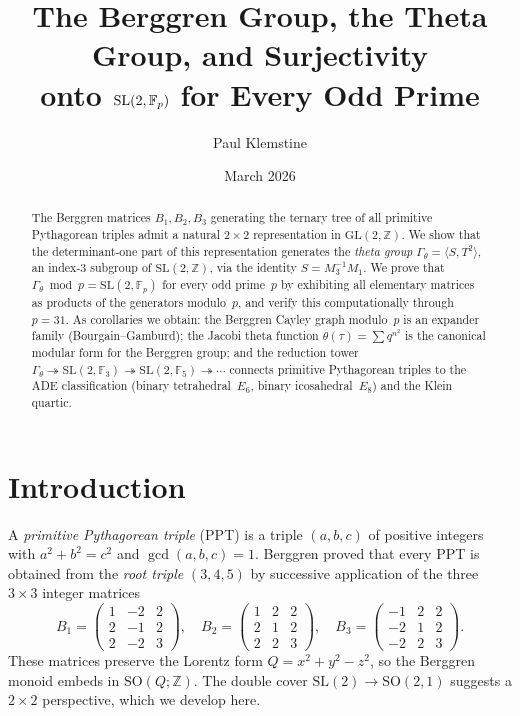 \documentclass[12pt]{amsart}
\title{The Berggren Group, the Theta Group, and Surjectivity\\
onto $\SL(2,\Fp)$ for Every Odd Prime}
\author{Paul Klemstine}
\date{March 2026}
\theoremstyle{definition}
\theoremstyle{remark}
\newcommand{\SL}{\mathrm{SL}}
\newcommand{\GL}{\mathrm{GL}}
\newcommand{\SO}{\mathrm{SO}}
\newcommand{\Fp}{\mathbb{F}_p}
\newcommand{\Z}{\mathbb{Z}}
\begin{document}
\begin{abstract}
The Berggren matrices $B_1, B_2, B_3$ generating the ternary tree of all
primitive Pythagorean triples admit a natural $2\times 2$ representation
in $\GL(2,\Z)$.  We show that the determinant-one part of this
representation generates the \emph{theta group}
$\Gamma_\theta = \langle S, T^2 \rangle$, an index-3 subgroup of
$\SL(2,\Z)$, via the identity $S = M_3^{-1} M_1$.  We prove that
$\Gamma_\theta \bmod p = \SL(2,\Fp)$ for every odd prime~$p$ by exhibiting
all elementary matrices as products of the generators modulo~$p$, and
verify this computationally through $p = 31$.  As corollaries we obtain:
the Berggren Cayley graph modulo~$p$ is an expander family
(Bourgain--Gamburd); the Jacobi theta function $\theta(\tau) = \sum q^{n^2}$
is the canonical modular form for the Berggren group; and the reduction
tower
$\Gamma_\theta \twoheadrightarrow \SL(2,\mathbb{F}_3) \twoheadrightarrow
\SL(2,\mathbb{F}_5) \twoheadrightarrow \cdots$ connects primitive
Pythagorean triples to the ADE classification (binary tetrahedral~$E_6$,
binary icosahedral~$E_8$) and the Klein quartic.
\end{abstract}

\maketitle

\section{Introduction}\label{sec:intro}

A \emph{primitive Pythagorean triple} (PPT) is a triple $(a,b,c)$ of
positive integers with $a^2+b^2=c^2$ and $\gcd(a,b,c)=1$.  Berggren
\cite{berggren} proved that every PPT is obtained from the \emph{root
triple} $(3,4,5)$ by successive application of the three $3\times3$
integer matrices
\begin{equation}\label{eq:berggren3x3}
B_1 = \begin{pmatrix} 1 & -2 & 2\\ 2 & -1 & 2\\ 2 & -2 & 3\end{pmatrix},\quad
B_2 = \begin{pmatrix} 1 & 2 & 2\\ 2 & 1 & 2\\ 2 & 2 & 3\end{pmatrix},\quad
B_3 = \begin{pmatrix} -1 & 2 & 2\\ -2 & 1 & 2\\ -2 & 2 & 3\end{pmatrix}.
\end{equation}
These matrices preserve the Lorentz form $Q = x^2+y^2-z^2$, so the
Berggren monoid embeds in $\SO(Q;\Z)$.  The double cover
$\SL(2) \to \SO(2,1)$ suggests a $2\times2$ perspective, which we develop
here.
\end{document}
